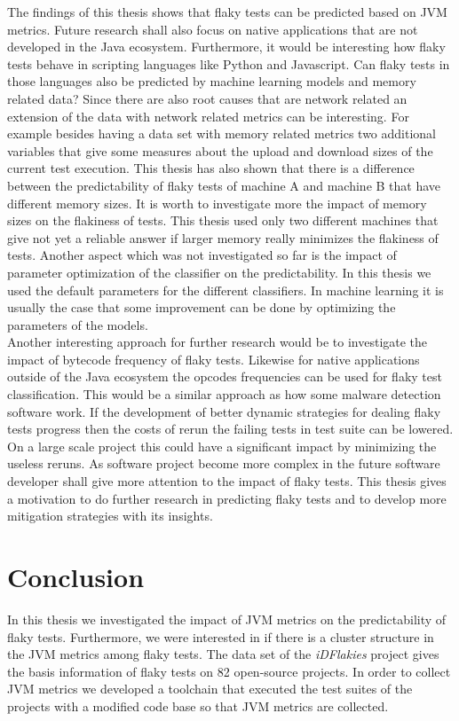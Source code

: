 \documentclass{seal_thesis}
\begin{document}
\noindent The findings of this thesis shows that flaky tests can be predicted based on JVM metrics. Future research shall also focus on native applications that are not developed in the Java ecosystem. Furthermore, it would be interesting how flaky tests behave in scripting languages like Python and Javascript. Can flaky tests in those languages also be predicted by machine learning models and memory related data? Since there are also root causes that are network related an extension of the data with network related metrics can be interesting. For example besides having a data set with memory related metrics two additional variables that give some measures about the upload and download sizes of the current test execution. This thesis has also shown that there is a difference between the predictability of flaky tests of machine A and machine B that have different memory sizes. It is worth to investigate more the impact of memory sizes on the flakiness of tests. This thesis used only two different machines that give not yet a reliable answer if larger memory really minimizes the flakiness of tests. Another aspect which was not investigated so far is the impact of parameter optimization of the classifier on the predictability. In this thesis we used the default parameters for the different classifiers. In machine learning it is usually the case that some improvement can be done by optimizing the parameters of the models. \\

\noindent Another interesting approach for further research would be to investigate the impact of bytecode frequency of flaky tests. Likewise for native applications outside of the Java ecosystem the opcodes frequencies can be used for flaky test classification. This would be a similar approach as how some malware detection software work. If the development of better dynamic strategies for dealing flaky tests progress then the costs of rerun the failing tests in test suite can be lowered. On a large scale project this could have a significant impact by minimizing the useless reruns. As software project become more complex in the future software developer shall give more attention to the impact of flaky tests. This thesis gives a motivation to do further research in predicting flaky tests and to develop more mitigation strategies with its insights.






\chapter{Conclusion}
In this thesis we investigated the impact of JVM metrics on the predictability of flaky tests. Furthermore, we were interested in if there is a cluster structure in the JVM metrics among flaky tests. The data set of the \textit{iDFlakies} project gives the basis information of flaky tests on 82 open-source projects. In order to collect JVM metrics we developed a toolchain that executed the test suites of the projects with a modified code base so that JVM metrics are collected. \\
\end{document}
